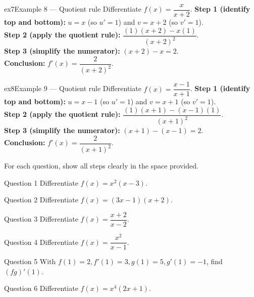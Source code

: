 \documentclass[11pt]{article}
\begin{document}
\begin{example}{ex7}{Example 8 --- Quotient rule}
Differentiate $f(x)=\dfrac{x}{x+2}$.\soln
\textbf{Step 1 (identify top and bottom):} $u=x$ (so $u'=1$) and $v=x+2$ (so $v'=1$).\\[3pt]
\textbf{Step 2 (apply the quotient rule):} $\dfrac{(1)(x+2)-x(1)}{(x+2)^2}$.\\[3pt]
\textbf{Step 3 (simplify the numerator):} $(x+2)-x=2$.\\[3pt]
\textbf{Conclusion:} $f'(x)=\dfrac{2}{(x+2)^2}$.
\end{example}

\begin{example}{ex8}{Example 9 --- Quotient rule}
Differentiate $f(x)=\dfrac{x-1}{x+1}$.\soln
\textbf{Step 1 (identify top and bottom):} $u=x-1$ (so $u'=1$) and $v=x+1$ (so $v'=1$).\\[3pt]
\textbf{Step 2 (apply the quotient rule):} $\dfrac{(1)(x+1)-(x-1)(1)}{(x+1)^2}$.\\[3pt]
\textbf{Step 3 (simplify the numerator):} $(x+1)-(x-1)=2$.\\[3pt]
\textbf{Conclusion:} $f'(x)=\dfrac{2}{(x+1)^2}$.
\end{example}

\clearpage
{}
For each question, show all steps clearly in the space provided.

\begin{qbox}{Question 1}
Differentiate $f(x)=x^2(x-3)$.\workspace{2.4cm}
\end{qbox}

\begin{qbox}{Question 2}
Differentiate $f(x)=(3x-1)(x+2)$.\workspace{2.4cm}
\end{qbox}

\begin{qbox}{Question 3}
Differentiate $f(x)=\dfrac{x+2}{x-2}$.\workspace{2.4cm}
\end{qbox}

\begin{qbox}{Question 4}
Differentiate $f(x)=\dfrac{x^2}{x-1}$.\workspace{2.4cm}
\end{qbox}

\begin{qbox}{Question 5}
With $f(1)=2,f'(1)=3,g(1)=5,g'(1)=-1$, find $(fg)'(1)$.\workspace{2.4cm}
\end{qbox}

\begin{qbox}{Question 6}
Differentiate $f(x)=x^4(2x+1)$.\workspace{2.4cm}
\end{qbox}
\end{document}
